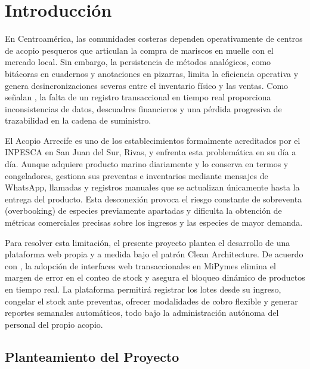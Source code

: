 
\section{Introducción}

En Centroamérica, las comunidades costeras dependen operativamente de centros de acopio pesqueros que articulan la compra de mariscos en muelle con el mercado local. Sin embargo, la persistencia de métodos analógicos, como bitácoras en cuadernos y anotaciones en pizarras, limita la eficiencia operativa y genera desincronizaciones severas entre el inventario físico y las ventas. Como señalan \textcite{ahumada2020sistema}, la falta de un registro transaccional en tiempo real proporciona inconsistencias de datos, descuadres financieros y una pérdida progresiva de trazabilidad en la cadena de suministro.

El Acopio Arrecife es uno de los establecimientos formalmente acreditados por el INPESCA en San Juan del Sur, Rivas, y enfrenta esta problemática en su día a día. Aunque adquiere producto marino diariamente y lo conserva en termos y congeladores, gestiona sus preventas e inventarios mediante mensajes de WhatsApp, llamadas y registros manuales que se actualizan únicamente hasta la entrega del producto. Esta desconexión provoca el riesgo constante de sobreventa (overbooking) de especies previamente apartadas y dificulta la obtención de métricas comerciales precisas sobre los ingresos y las especies de mayor demanda.

Para resolver esta limitación, el presente proyecto plantea el desarrollo de una plataforma web propia y a medida bajo el patrón Clean Architecture. De acuerdo con \textcite{villasmil2021}, la adopción de interfaces web transaccionales en MiPymes elimina el margen de error en el conteo de stock y asegura el bloqueo dinámico de productos en tiempo real. La plataforma permitirá registrar los lotes desde su ingreso, congelar el stock ante preventas, ofrecer modalidades de cobro flexible y generar reportes semanales automáticos, todo bajo la administración autónoma del personal del propio acopio.

\subsection{Planteamiento del Proyecto}

